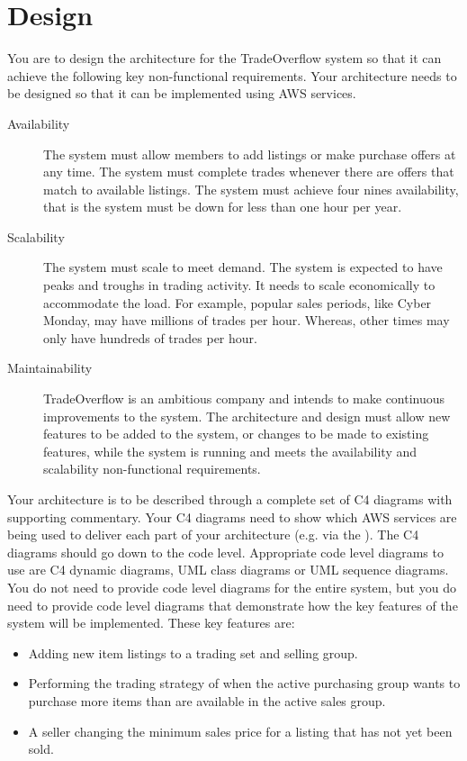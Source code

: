 \documentclass{csse4400}
\begin{document}
\section{Design}
You are to design the architecture for the TradeOverflow system so that it can achieve the following key non-functional requirements. Your architecture needs to be designed so that it can be implemented using AWS services.
\begin{description}
    \item[Availability] The system must allow members to add listings or make purchase offers at any time. The system must complete trades whenever there are offers that match to available listings. The system must achieve four nines availability, that is the system must be down for less than one hour per year.
    \item[Scalability] The system must scale to meet demand. The system is expected to have peaks and troughs in trading activity. It needs to scale economically to accommodate the load. For example, popular sales periods, like Cyber Monday, may have millions of trades per hour. Whereas, other times may only have hundreds of trades per hour.
    \item[Maintainability] TradeOverflow is an ambitious company and intends to make continuous improvements to the system. The architecture and design must allow new features to be added to the system, or changes to be made to existing features, while the system is running and meets the availability and scalability non-functional requirements.
\end{description}

Your architecture is to be described through a complete set of C4 diagrams with supporting commentary.
Your C4 diagrams need to show which AWS services are being used to deliver each part of your architecture
(e.g. via the ).
The C4 diagrams should go down to the code level.
Appropriate code level diagrams to use are C4 dynamic diagrams, UML class diagrams or UML sequence diagrams.
You do not need to provide code level diagrams for the entire system,
but you do need to provide code level diagrams that demonstrate how the key features of the system will be implemented.
These key features are:
\begin{itemize}
	\item Adding new item listings to a trading set and selling group.
	\item Performing the trading strategy of when the active purchasing group wants to purchase more items than are available in the active sales group.
	\item A seller changing the minimum sales price for a listing that has not yet been sold.
\end{itemize}
\end{document}
